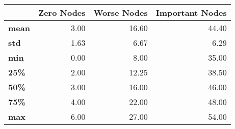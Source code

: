 \begin{tabular}{lrrr}
\toprule
{} &  Zero Nodes &  Worse Nodes &  Important Nodes \\
\midrule
\textbf{mean} &        3.00 &        16.60 &            44.40 \\
\textbf{std } &        1.63 &         6.67 &             6.29 \\
\textbf{min } &        0.00 &         8.00 &            35.00 \\
\textbf{25\% } &        2.00 &        12.25 &            38.50 \\
\textbf{50\% } &        3.00 &        16.00 &            46.00 \\
\textbf{75\% } &        4.00 &        22.00 &            48.00 \\
\textbf{max } &        6.00 &        27.00 &            54.00 \\
\bottomrule
\end{tabular}

